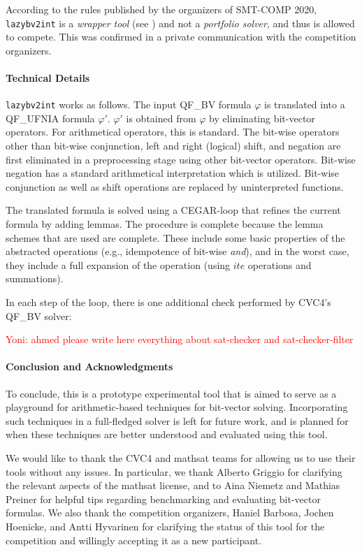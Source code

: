 \documentclass{easychair}
\newcommand{\comment}[3]{\begin{mdframed}{{\textcolor{#1}{#2: #3}}}\end{mdframed}}
\newcommand{\yoni}[1]{\comment{red}{Yoni}{#1}}
\newcommand{\lazybvtoint}{\texttt{lazybv2int}\xspace}
\newcommand{\smtcomp}{SMT-COMP\xspace}
\newcommand{\qfbv}{QF\_BV\xspace}
\newcommand{\qfufnia}{QF\_UFNIA\xspace}
\newcommand{\msat}{mathsat\xspace}
\newcommand{\cvcfour}{CVC4\xspace}
\begin{document}
According to the rules published by the organizers
of \smtcomp 2020, \lazybvtoint is a {\em wrapper tool} (see \cite{rules20})
and not a {\em portfolio solver},
and thus is allowed to compete.
This was confirmed in a private communication with the competition organizers.

\paragraph{Technical Details}
\lazybvtoint works as follows.
The input \qfbv formula $\varphi$ is translated into a
\qfufnia formula $\varphi'$.
$\varphi'$ is obtained from $\varphi$ by eliminating
bit-vector operators.
For arithmetical operators, this is standard.
The bit-wise operators other than bit-wise conjunction, left
and right (logical) shift, and negation are first
eliminated in a preprocessing stage using other bit-vector operators.
Bit-wise negation has a standard arithmetical interpretation which is utilized.
Bit-wise conjunction as well as shift operations are replaced by uninterpreted functions.

The translated formula is solved using a CEGAR-loop that refines the current formula by adding lemmas.
The procedure is complete because the lemma schemes that are used are complete.
%
These include some basic properties of the abstracted operations
(e.g., idempotence of bit-wise \emph{and}), and in the worst case,
they include a full expansion of the operation (using
$ite$ operations and summations).

In each step of the loop, there is one additional check performed by \cvcfour's \qfbv solver:
\yoni{ahmed please write here everything about sat-checker and sat-checker-filter}


\paragraph{Conclusion and Acknowledgments}
To conclude, this is a prototype experimental tool that is aimed
to serve as a playground for arithmetic-based techniques
for bit-vector solving.
Incorporating such techniques in a full-fledged solver is left for future work,
and is planned for when these techniques are better
understood and evaluated using this tool.

We would like to thank the \cvcfour and \msat teams for allowing us
to use their tools without any issues.
In particular, we thank Alberto Griggio for clarifying
the relevant aspects of the \msat license,
and to Aina Niemetz and Mathias Preiner for helpful tips
regarding benchmarking and evaluating bit-vector formulas.
We also thank the competition organizers,
Haniel Barbosa, Jochen Hoenicke, and
Antti Hyvarinen for clarifying the status of this tool for the competition and willingly accepting it as a new participant.



  
  
\end{document}
